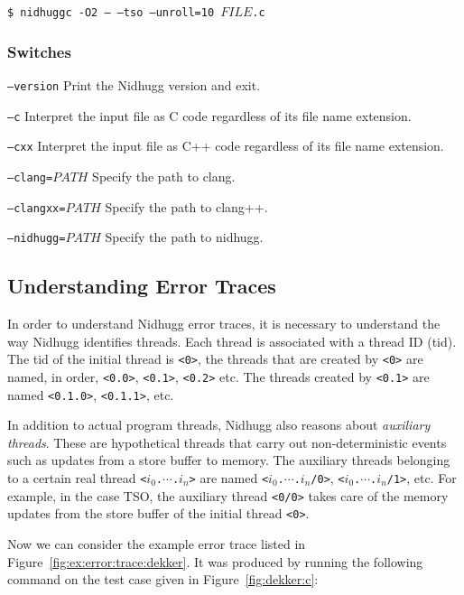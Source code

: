 \documentclass[a4paper]{article}
\begin{document}
\vspace{5pt}
\noindent
\texttt{\$ nidhuggc -O2 -- --tso --unroll=10 $FILE$.c}

\subsubsection{Switches}

\begin{description}
\item{\texttt{--version}}
%
  Print the Nidhugg version and exit.
\item{\texttt{--c}}
%
  Interpret the input file as C code regardless of its file name
  extension.
\item{\texttt{--cxx}}
%
  Interpret the input file as C++ code regardless of its file name
  extension.
\item{\texttt{--clang=$PATH$}}
%
  Specify the path to \textsf{clang}.
\item{\texttt{--clangxx=$PATH$}}
%
  Specify the path to \textsf{clang++}.
\item{\texttt{--nidhugg=$PATH$}}
%
  Specify the path to \textsf{nidhugg}.
\end{description}

\subsection{Understanding Error Traces}\label{sec:understand:error:traces}

In order to understand Nidhugg error traces, it is necessary to
understand the way Nidhugg identifies threads. Each thread is
associated with a thread ID (tid). The tid of the initial thread is
\texttt{<0>}, the threads that are created by \texttt{<0>} are named,
in order, \texttt{<0.0>}, \texttt{<0.1>}, \texttt{<0.2>} etc. The
threads created by \texttt{<0.1>} are named \texttt{<0.1.0>},
\texttt{<0.1.1>}, etc.

In addition to actual program threads, Nidhugg also reasons about
\emph{auxiliary threads}. These are hypothetical threads that carry
out non-deterministic events such as updates from a store buffer to
memory. The auxiliary threads belonging to a certain real thread
\texttt{<$i_0$.$\cdots$.$i_n$>} are named
\texttt{<$i_0$.$\cdots$.$i_n$/0>}, \texttt{<$i_0$.$\cdots$.$i_n$/1>},
etc. For example, in the case TSO, the auxiliary thread \texttt{<0/0>}
takes care of the memory updates from the store buffer of the initial
thread \texttt{<0>}.

Now we can consider the example error trace listed in
Figure~\ref{fig:ex:error:trace:dekker}. It was produced by running the
following command on the test case given in Figure~\ref{fig:dekker:c}:
\end{document}
